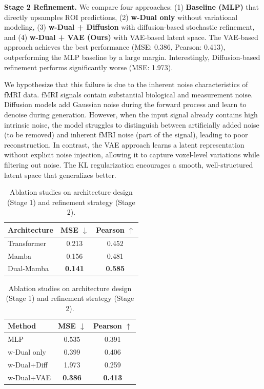 \textbf{Stage 2 Refinement.}
We compare four approaches:
(1) \textbf{Baseline (MLP)} that directly upsamples ROI predictions,
(2) \textbf{w-Dual only} without variational modeling,
(3) \textbf{w-Dual + Diffusion} with diffusion-based stochastic refinement, and
(4) \textbf{w-Dual + VAE (Ours)} with VAE-based latent space.
The VAE-based approach achieves the best performance (MSE: 0.386, Pearson: 0.413),
outperforming the MLP baseline by a large margin.
Interestingly, Diffusion-based refinement performs significantly worse (MSE: 1.973).

We hypothesize that this failure is due to the inherent noise characteristics of fMRI data.
fMRI signals contain substantial biological and measurement noise.
Diffusion models add Gaussian noise during the forward process and learn to denoise during generation.
However, when the input signal already contains high intrinsic noise,
the model struggles to distinguish between artificially added noise (to be removed)
and inherent fMRI noise (part of the signal), leading to poor reconstruction.
In contrast, the VAE approach learns a latent representation without explicit noise injection,
allowing it to capture voxel-level variations while filtering out noise.
The KL regularization encourages a smooth, well-structured latent space that generalizes better.

\begin{table}[t]
\centering
\caption{Ablation studies on architecture design (Stage 1) and refinement strategy (Stage 2).}
\label{tab:ablation_stages}
\begin{minipage}{0.48\linewidth}
\centering
{}
\label{tab:ablation_stage1}
\begin{tabular}{lcc}
\toprule
\textbf{Architecture} & \textbf{MSE} $\downarrow$ & \textbf{Pearson} $\uparrow$ \\
\midrule
Transformer & 0.213 & 0.452 \\
Mamba & 0.156 & 0.481 \\
\midrule
Dual-Mamba & \textbf{0.141} & \textbf{0.585} \\
\bottomrule
\end{tabular}
\end{minipage}%
\hfill
\begin{minipage}{0.48\linewidth}
\centering
{}
\label{tab:ablation_stage2}
\begin{tabular}{lcc}
\toprule
\textbf{Method} & \textbf{MSE} $\downarrow$ & \textbf{Pearson} $\uparrow$ \\
\midrule
MLP & 0.535 & 0.391 \\
w-Dual only & 0.399 & 0.406 \\
w-Dual+Diff & 1.973 & 0.259 \\
\midrule
w-Dual+VAE & \textbf{0.386} & \textbf{0.413} \\
\bottomrule
\end{tabular}
\end{minipage}
\end{table}


